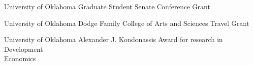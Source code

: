 {%
	University of Oklahoma}
{%
	Graduate Student Senate Conference Grant}
{}

{%
	University of Oklahoma}
{%
	Dodge Family College of Arts and Sciences Travel Grant}
{}

{%
	University of Oklahoma}
{%
	Alexander J. Kondonassis Award for research in Development \\ Economics }
{}
